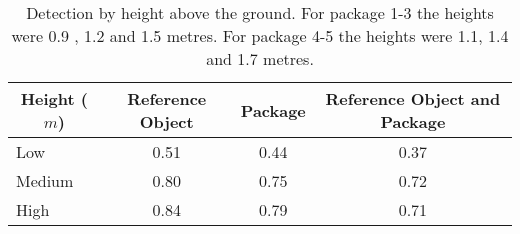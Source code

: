 \begin{table}[H]
\centering
\begin{tabular}{@{} l *3c @{}}
\toprule
 \multicolumn{1}{c}{Height ($m$)} & Reference Object  & Package  & Reference Object and Package  \\ 
\midrule
 Low 		& 0.51 & 0.44 & 0.37 \\ 
 Medium 	& 0.80 & 0.75 & 0.72 \\
 High		& 0.84 & 0.79 & 0.71 \\
\bottomrule
 \end{tabular}
 \caption{Detection by height above the ground. For package 1-3 the heights were 0.9 , 1.2 and 1.5 metres. For package 4-5 the heights were 1.1, 1.4 and 1.7 metres.} 
\label{table:detection_by_height}
\end{table}